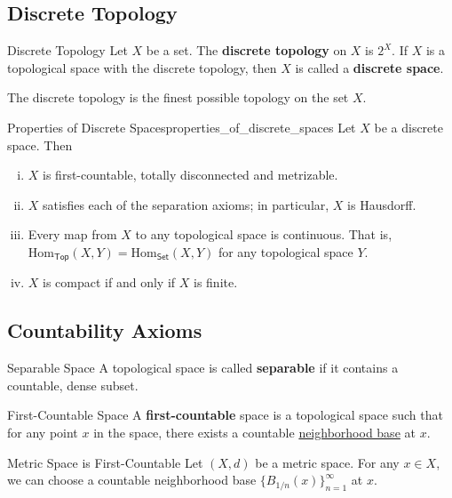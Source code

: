 \documentclass{report}
\begin{document}
\subsection{Discrete Topology}

\begin{definition}{Discrete Topology}{}
	Let $X$ be a set. The \textbf{discrete topology} on $X$ is $2^X$. If $X$ is a topological space with the discrete topology, then $X$ is called a \textbf{discrete space}.
\end{definition}

The discrete topology is the finest possible topology on the set $X$.

\begin{proposition}{Properties of Discrete Spaces}{properties_of_discrete_spaces}
	Let $X$ be a discrete space. Then
	\begin{enumerate}[(i)]	
		\item $X$ is first-countable, totally disconnected and metrizable.
		\item $X$ satisfies each of the separation axioms; in particular, $X$ is Hausdorff.
		\item Every map from $X$ to any topological space is continuous. That is, $\mathrm{Hom}_{\mathsf{Top}}(X,Y)=\mathrm{Hom}_{\mathsf{Set}}(X,Y)$ for any topological space $Y$.
		\item $X$ is compact if and only if $X$ is finite.
	\end{enumerate}
\end{proposition}

\subsection{Countability Axioms}

\begin{definition}{Separable Space}{}
	A topological space is called \textbf{separable} if it contains a countable, dense subset.
\end{definition}


\begin{definition}{First-Countable Space}{}
	A \textbf{first-countable} space is a topological space such that for any point $x$ in the space, there exists a countable \hyperref[th:neighborhood_base]{neighborhood base} at $x$.
\end{definition}

\begin{example}{Metric Space is First-Countable}{}
	Let $(X,d)$ be a metric space. For any $x\in X$, we can choose a countable neighborhood base $\{B_{1/n}(x)\}_{n=1}^\infty$ at $x$.
\end{example}
\end{document}

